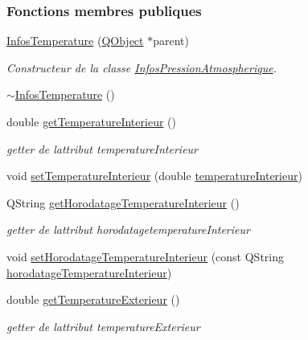 \subsubsection*{Fonctions membres publiques}
\begin{DoxyCompactItemize}
\item 
\hyperlink{class_infos_temperature_ac628607fe2ff9ca9e2d6bad741ae231a}{Infos\+Temperature} (\hyperlink{class_q_object}{Q\+Object} $\ast$parent)
\begin{DoxyCompactList}\small\item\em Constructeur de la classe \hyperlink{class_infos_pression_atmospherique}{Infos\+Pression\+Atmospherique}. \end{DoxyCompactList}\item 
\hyperlink{class_infos_temperature_a86503a69e48f1919edbb02a434d2b124}{$\sim$\+Infos\+Temperature} ()
\item 
double \hyperlink{class_infos_temperature_aaf4cb4fd8a7c46d14955d3175498f91c}{get\+Temperature\+Interieur} ()
\begin{DoxyCompactList}\small\item\em getter de l\textquotesingle{}attribut temperature\+Interieur \end{DoxyCompactList}\item 
void \hyperlink{class_infos_temperature_ac11ec6b1860f43dc989a02a7967497e7}{set\+Temperature\+Interieur} (double \hyperlink{class_infos_temperature_a976ab7ead7ac82b5b8572807d778689e}{temperature\+Interieur})
\item 
Q\+String \hyperlink{class_infos_temperature_aca40f109786cf22d78402f8b7f3fe408}{get\+Horodatage\+Temperature\+Interieur} ()
\begin{DoxyCompactList}\small\item\em getter de l\textquotesingle{}attribut horodatagetemperature\+Interieur \end{DoxyCompactList}\item 
void \hyperlink{class_infos_temperature_a4d846391dfd204515e68c3f005b7be3c}{set\+Horodatage\+Temperature\+Interieur} (const Q\+String \hyperlink{class_infos_temperature_ad4c62d479b8897102a59025a56d7b4c6}{horodatage\+Temperature\+Interieur})
\item 
double \hyperlink{class_infos_temperature_aebb00308151b8b6319732b62bd7b4b55}{get\+Temperature\+Exterieur} ()
\begin{DoxyCompactList}\small\item\em getter de l\textquotesingle{}attribut temperature\+Exterieur \end{DoxyCompactList}\item 

\end{DoxyCompactItemize}

